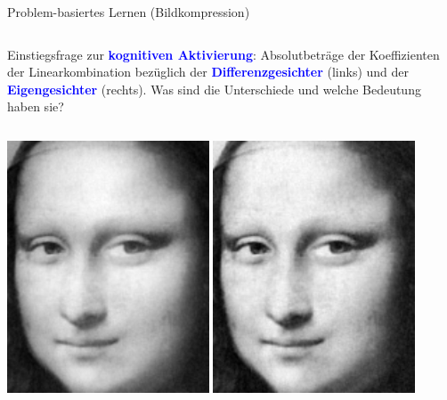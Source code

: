 \documentclass[10pt,aspectratio=169]{beamer}
\begin{document}
\begin{frame}[fragile]{Problem-basiertes Lernen (Bildkompression)}
	\begin{minipage}{0.72\textwidth}
		\begin{columns}[T,onlytextwidth]
			\column{\textwidth}
			\begin{block}{Einstiegsfrage zur \textcolor{blue}{\textbf{kognitiven Aktivierung}}:}
				Absolutbeträge der Koeffizienten der Linearkombination bezüglich der \textcolor{blue}{\textbf{Differenzgesichter}} (links) und der \textcolor{blue}{\textbf{Eigengesichter}} (rechts).
				Was sind die Unterschiede und welche Bedeutung haben sie?
			\end{block}
		\end{columns}
	\end{minipage}\hfill
	\begin{minipage}{0.25\textwidth}
		\includegraphics[width=0.45\textwidth]{images/eigenfaces/mona_lisa_naive_approx}
		\includegraphics[width=0.45\textwidth]{images/eigenfaces/mona_lisa_eigen_approx}
	\end{minipage}
	\begin{tabular}{cc}

\end{tabular}
\end{frame}
\end{document}

